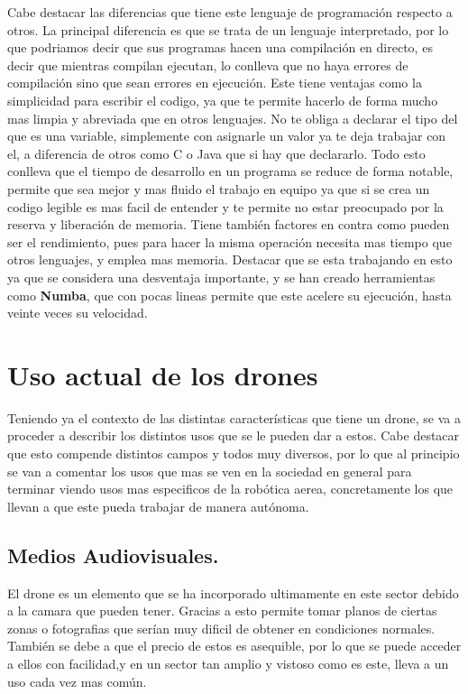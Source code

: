 	Cabe destacar las diferencias que tiene este lenguaje de programaci\'on respecto a otros. La principal diferencia es que se trata de un lenguaje interpretado, por lo que podriamos decir que sus programas hacen una compilaci\'on en directo, es decir que mientras compilan ejecutan, lo conlleva que no haya errores de compilaci\'on sino que sean errores en ejecuci\'on. Este tiene ventajas como la simplicidad para escribir el codigo, ya que te permite hacerlo de forma mucho mas limpia y abreviada que en otros lenguajes. No te obliga a declarar el tipo del que es una variable, simplemente con asignarle un valor ya te deja trabajar con el, a diferencia de otros como C o Java que si hay que declararlo. Todo esto conlleva que el tiempo de desarrollo en un programa se reduce de forma notable, permite que sea mejor y mas fluido el trabajo en equipo ya que si se crea un codigo legible es mas facil de entender y te permite no estar preocupado por la reserva y liberaci\'on de memoria. Tiene tambi\'en factores en contra como pueden ser el rendimiento, pues para hacer la misma operaci\'on necesita mas tiempo que otros lenguajes, y emplea mas memoria. Destacar que se esta trabajando en esto ya que se considera una desventaja importante, y se han creado herramientas como \textbf{Numba}, que con pocas lineas permite que este acelere su ejecuci\'on, hasta veinte veces su velocidad. 
	
	
\section{Uso actual de los drones}
\hspace{1 cm} Teniendo ya el contexto de las distintas caracter\'isticas que tiene un drone, se va a proceder a describir los distintos usos que se le pueden dar a estos. Cabe destacar que esto compende distintos campos y todos muy diversos, por lo que al principio se van a comentar los usos que mas se ven en la sociedad en general para terminar viendo usos mas especificos de la rob\'otica aerea, concretamente los que llevan a que este pueda trabajar de manera aut\'onoma. 

\subsection{Medios Audiovisuales.}
\hspace{1 cm} El drone es un elemento que se ha incorporado ultimamente en este sector debido a la camara que pueden tener. Gracias a esto permite tomar planos de ciertas zonas o fotografias que ser\'ian muy dificil de obtener en condiciones normales. Tambi\'en se debe a que el precio de estos es asequible, por lo que se puede acceder a ellos con facilidad,y en un sector tan amplio y vistoso como es este, lleva a un uso cada vez mas com\'un.

